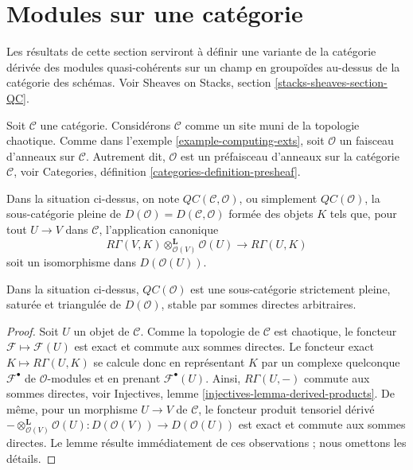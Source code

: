 \section{Modules sur une catégorie}
\label{section-modules-cohomology}

\noindent
Les résultats de cette section serviront à définir une variante de la
catégorie dérivée des modules quasi-cohérents sur un champ en groupoïdes
au-dessus de la catégorie des schémas. Voir Sheaves on Stacks, section
\ref{stacks-sheaves-section-QC}.

\medskip\noindent
Soit $\mathcal{C}$ une catégorie. Considérons $\mathcal{C}$ comme un site muni
de la topologie chaotique. Comme dans l'exemple
\ref{example-computing-exts}, soit
$\mathcal{O}$ un faisceau d'anneaux sur $\mathcal{C}$. Autrement dit,
$\mathcal{O}$ est un préfaisceau d'anneaux sur la catégorie $\mathcal{C}$,
voir Categories, définition \ref{categories-definition-presheaf}.

\begin{definition}
\label{definition-cartesian}
Dans la situation ci-dessus, on note
$\mathit{QC}(\mathcal{C}, \mathcal{O})$, ou simplement
{\it $\mathit{QC}(\mathcal{O})$}, la sous-catégorie pleine de
$D(\mathcal{O}) = D(\mathcal{C}, \mathcal{O})$ formée des objets $K$ tels que,
pour tout $U \to V$ dans $\mathcal{C}$, l'application canonique
$$
R\Gamma(V, K) \otimes_{\mathcal{O}(V)}^\mathbf{L} \mathcal{O}(U)
\longrightarrow
R\Gamma(U, K)
$$
soit un isomorphisme dans $D(\mathcal{O}(U))$.
\end{definition}

\begin{lemma}
\label{lemma-cartesian-good-sub}
Dans la situation ci-dessus, $\mathit{QC}(\mathcal{O})$ est une
sous-catégorie strictement pleine, saturée et triangulée de
$D(\mathcal{O})$, stable par sommes directes arbitraires.
\end{lemma}

\begin{proof}
Soit $U$ un objet de $\mathcal{C}$. Comme la topologie de $\mathcal{C}$ est
chaotique, le foncteur $\mathcal{F} \mapsto \mathcal{F}(U)$ est exact et
commute aux sommes directes. Le foncteur exact
$K \mapsto R\Gamma(U, K)$ se calcule donc en représentant $K$ par un complexe
quelconque $\mathcal{F}^\bullet$ de $\mathcal{O}$-modules et en prenant
$\mathcal{F}^\bullet(U)$. Ainsi, $R\Gamma(U, -)$ commute aux sommes directes,
voir Injectives, lemme \ref{injectives-lemma-derived-products}. De même, pour
un morphisme $U \to V$ de $\mathcal{C}$, le foncteur produit tensoriel dérivé
$- \otimes_{\mathcal{O}(V)}^\mathbf{L} \mathcal{O}(U) :
D(\mathcal{O}(V)) \to D(\mathcal{O}(U))$
est exact et commute aux sommes directes. Le lemme résulte immédiatement de
ces observations ; nous omettons les détails.
\end{proof}

